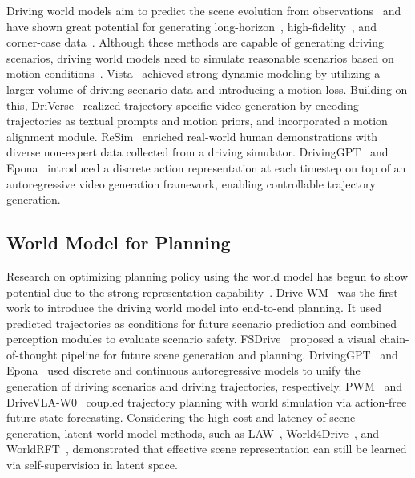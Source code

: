 Driving world models aim to predict the scene evolution from observations~\cite{review4, review5, review6, review7} and have shown great potential for generating long-horizon~\cite{magicdrivev2, vista, infinitydrive}, high-fidelity~\cite{drivedreamer, uniscene, drivingsphere}, and corner-case data~\cite{cosmos, terasim, sun2025terasim}. Although these methods are capable of generating driving scenarios, driving world models need to simulate reasonable scenarios based on motion conditions~\cite{jia2023adriver, hu2023gaia, genad, hassan2025gem}. Vista~\cite{vista} achieved strong dynamic modeling by utilizing a larger volume of driving scenario data and introducing a motion loss. Building on this, DriVerse~\cite{driverse} realized trajectory-specific video generation by encoding trajectories as textual prompts and motion priors, and incorporated a motion alignment module. ReSim~\cite{yang2025resim} enriched real-world human demonstrations with diverse non-expert data collected from a driving simulator. DrivingGPT~\cite{drivinggpt} and Epona~\cite{epona} introduced a discrete action representation at each timestep on top of an autoregressive video generation framework, enabling controllable trajectory generation.

\subsection{World Model for Planning}
Research on optimizing planning policy using the world model has begun to show potential due to the strong representation capability~\cite{review4, review5, review8}. Drive-WM~\cite{drivewm} was the first work to introduce the driving world model into end-to-end planning. It used predicted trajectories as conditions for future scenario prediction and combined perception modules to evaluate scenario safety. FSDrive~\cite{zeng2025fsdrive} proposed a visual chain-of-thought pipeline for future scene generation and planning. DrivingGPT~\cite{drivinggpt} and Epona~\cite{epona} used discrete and continuous autoregressive models to unify the generation of driving scenarios and driving trajectories, respectively. PWM~\cite{zhao2025pwm} and DriveVLA-W0~\cite{drivevlaw0} coupled trajectory planning with world simulation via action-free future state forecasting. Considering the high cost and latency of scene generation, latent world model methods, such as LAW~\cite{law}, World4Drive~\cite{world4drive}, and WorldRFT~\cite{yang2025worldrft}, demonstrated that effective scene representation can still be learned via self-supervision in latent space.
